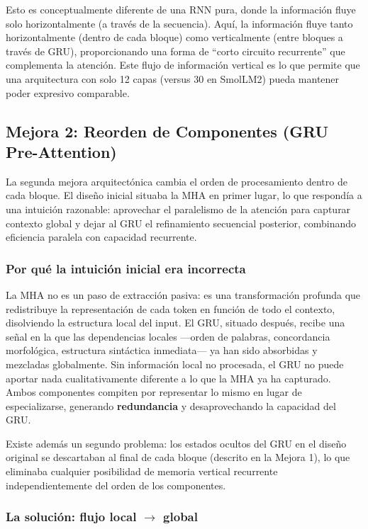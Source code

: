 Esto es conceptualmente diferente de una RNN pura, donde la información fluye solo horizontalmente (a través de la secuencia). Aquí, la información fluye tanto horizontalmente (dentro de cada bloque) como verticalmente (entre bloques a través de GRU), proporcionando una forma de ``corto circuito recurrente'' que complementa la atención. Este flujo de información vertical es lo que permite que una arquitectura con solo 12 capas (versus 30 en SmolLM2) pueda mantener poder expresivo comparable.

\subsection{Mejora 2: Reorden de Componentes (GRU Pre-Attention)}

La segunda mejora arquitectónica cambia el orden de procesamiento dentro de cada bloque. El diseño inicial situaba la MHA en primer lugar, lo que respondía a una intuición razonable: aprovechar el paralelismo de la atención para capturar contexto global y dejar al GRU el refinamiento secuencial posterior, combinando eficiencia paralela con capacidad recurrente.

\subsubsection*{Por qué la intuición inicial era incorrecta}

La MHA no es un paso de extracción pasiva: es una transformación profunda que redistribuye la representación de cada token en función de todo el contexto, disolviendo la estructura local del input. El GRU, situado después, recibe una señal en la que las dependencias locales —orden de palabras, concordancia morfológica, estructura sintáctica inmediata— ya han sido absorbidas y mezcladas globalmente. Sin información local no procesada, el GRU no puede aportar nada cualitativamente diferente a lo que la MHA ya ha capturado. Ambos componentes compiten por representar lo mismo en lugar de especializarse, generando \textbf{redundancia} y desaprovechando la capacidad del GRU.

Existe además un segundo problema: los estados ocultos del GRU en el diseño original se descartaban al final de cada bloque (descrito en la Mejora 1), lo que eliminaba cualquier posibilidad de memoria vertical recurrente independientemente del orden de los componentes.

\subsubsection*{La solución: flujo local $\to$ global}

